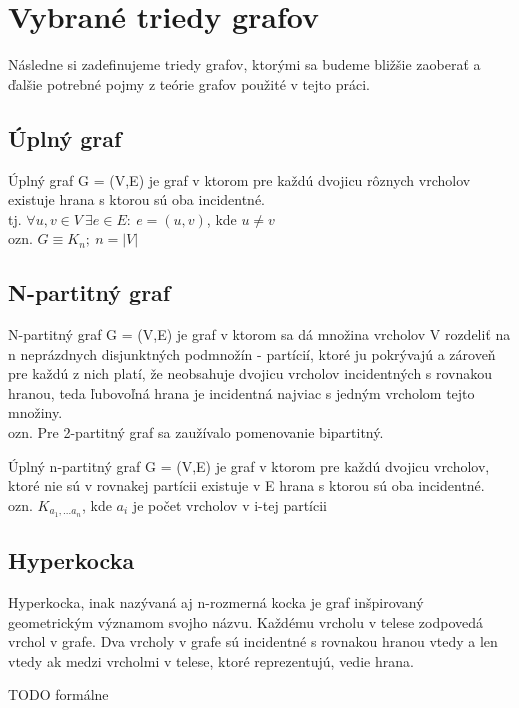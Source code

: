 \section{Vybrané triedy grafov}
Následne si zadefinujeme triedy grafov, ktorými sa budeme bližšie zaoberať a ďalšie potrebné pojmy z teórie grafov použité v tejto práci. 

\subsection{Úplný graf}
\begin{defin}
Úplný graf G = (V,E) je graf v ktorom pre každú dvojicu rôznych vrcholov existuje hrana s ktorou sú oba incidentné.\\
tj. $\forall u,v \in V\ \exists e \in  E :\ e=(u,v)$, kde $u \neq v$\\
ozn. $G \equiv K_n;\ n=|V|$
\end{defin}
\subsection{N-partitný graf}
\begin{defin}
N-partitný graf G = (V,E) je graf v ktorom sa dá množina vrcholov V rozdeliť na n neprázdnych disjunktných podmnožín - partícií, ktoré ju pokrývajú a zároveň pre každú z nich platí, že neobsahuje dvojicu vrcholov incidentných s rovnakou hranou, teda ľubovoľná hrana je incidentná najviac s jedným vrcholom tejto množiny.\\
ozn. Pre 2-partitný graf sa zaužívalo pomenovanie bipartitný.
\end{defin}

\begin{defin}
Úplný n-partitný graf G = (V,E) je graf v ktorom pre každú dvojicu vrcholov, ktoré nie sú v rovnakej partícii existuje v E hrana s ktorou sú oba incidentné.\\
ozn. $K_{a_1,...a_n}$, kde $a_i$ je počet vrcholov v i-tej partícii
\end{defin}

\subsection{Hyperkocka}
Hyperkocka, inak nazývaná aj n-rozmerná kocka je graf inšpirovaný geometrickým významom svojho názvu. Každému vrcholu v telese zodpovedá vrchol v grafe. Dva vrcholy v grafe sú incidentné s rovnakou hranou vtedy a len vtedy ak medzi vrcholmi v telese, ktoré reprezentujú, vedie hrana.
\begin{defin}
TODO formálne
\end{defin}
